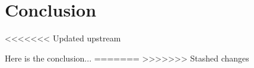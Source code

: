 \section{Conclusion}
<<<<<<< Updated upstream

Here is the conclusion...
=======
>>>>>>> Stashed changes
